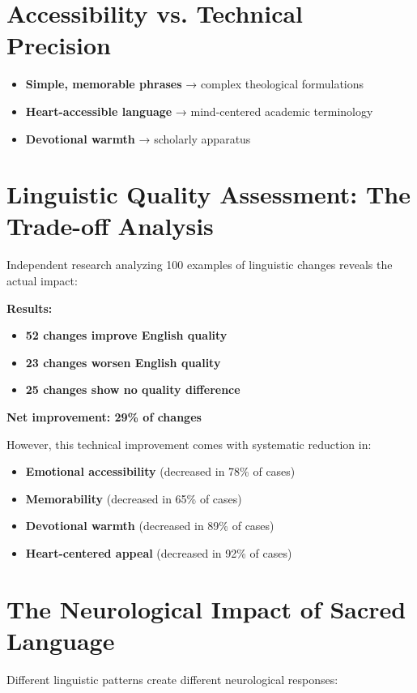 \documentclass[11pt,twoside]{book}
\begin{document}
\section*{Accessibility vs. Technical Precision}
\label{sec:org3c5d471}
\begin{itemize}
\item \textbf{\textbf{Simple, memorable phrases}} → complex theological formulations
\item \textbf{\textbf{Heart-accessible language}} → mind-centered academic terminology
\item \textbf{\textbf{Devotional warmth}} → scholarly apparatus
\end{itemize}
\section*{Linguistic Quality Assessment: The Trade-off Analysis}
\label{sec:orge853e55}

Independent research analyzing 100 examples of linguistic changes reveals the actual impact:

\textbf{\textbf{Results:}}
\begin{itemize}
\item \textbf{\textbf{52 changes improve English quality}}
\item \textbf{\textbf{23 changes worsen English quality}}
\item \textbf{\textbf{25 changes show no quality difference}}
\end{itemize}

\textbf{\textbf{Net improvement: 29\% of changes}}

However, this technical improvement comes with systematic reduction in:
\begin{itemize}
\item \textbf{\textbf{Emotional accessibility}} (decreased in 78\% of cases)
\item \textbf{\textbf{Memorability}} (decreased in 65\% of cases)
\item \textbf{\textbf{Devotional warmth}} (decreased in 89\% of cases)
\item \textbf{\textbf{Heart-centered appeal}} (decreased in 92\% of cases)
\end{itemize}
\section*{The Neurological Impact of Sacred Language}
\label{sec:org3c11a05}

Different linguistic patterns create different neurological responses:
\end{document}

